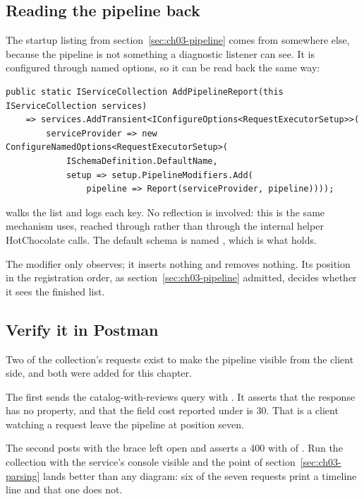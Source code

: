 \subsection*{Reading the pipeline back}

%
The startup listing from section~\ref{sec:ch03-pipeline} comes from somewhere
else, because the pipeline is not something a diagnostic listener can see. It is
configured through named options, so it can be read back the same way:

\begin{verbatim}
public static IServiceCollection AddPipelineReport(this IServiceCollection services)
    => services.AddTransient<IConfigureOptions<RequestExecutorSetup>>(
        serviceProvider => new ConfigureNamedOptions<RequestExecutorSetup>(
            ISchemaDefinition.DefaultName,
            setup => setup.PipelineModifiers.Add(
                pipeline => Report(serviceProvider, pipeline))));
\end{verbatim}

 walks the list and logs each key. No reflection is involved: this
is the same mechanism  uses, reached through
 rather than through the internal helper
HotChocolate calls. The default schema is named , which is what
 holds.

The modifier only observes; it inserts nothing and removes nothing. Its position
in the registration order, as section~\ref{sec:ch03-pipeline} admitted, decides
whether it sees the finished list.

\subsection*{Verify it in Postman}

%
Two of the collection's requests exist to make the pipeline visible from the
client side, and both were added for this chapter.

The first sends the catalog-with-reviews query with . It asserts that the response has no  property, and that
the field cost reported under  is 30. That is a
client watching a request leave the pipeline at position seven.

The second posts  with the brace left open and
asserts a 400 with  of . Run the collection
with the service's console visible and the point of
section~\ref{sec:ch03-parsing} lands better than any diagram: six of the seven
requests print a timeline line and that one does not.

